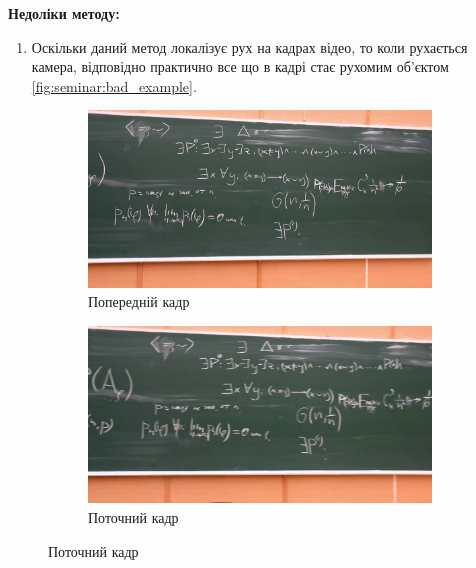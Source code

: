 \textbf{Недоліки методу:}
\begin{enumerate}
    \item Оскільки даний метод локалізує рух на кадрах відео, то коли 
    рухається камера, відповідно практично все що в кадрі стає рухомим об'єктом 
    \ref{fig:seminar:bad_example}.
\end{enumerate}

\begin{figure}[h]
    \centering
    \begin{subfigure}[c]{0.4\textwidth}
        \centering
        \includegraphics[width=\textwidth]{images/bad_example_1}
        \caption{Попередній кадр
        \label{fig:seminar:bad_example:a}
        }
    \end{subfigure}
    \begin{subfigure}[c]{0.4\textwidth}
        \centering
        \includegraphics[width=\textwidth]{images/bad_example_2}
        \caption{Поточний кадр
        \label{fig:seminar:bad_example:b}
        }
    \end{subfigure}
\end{figure}
